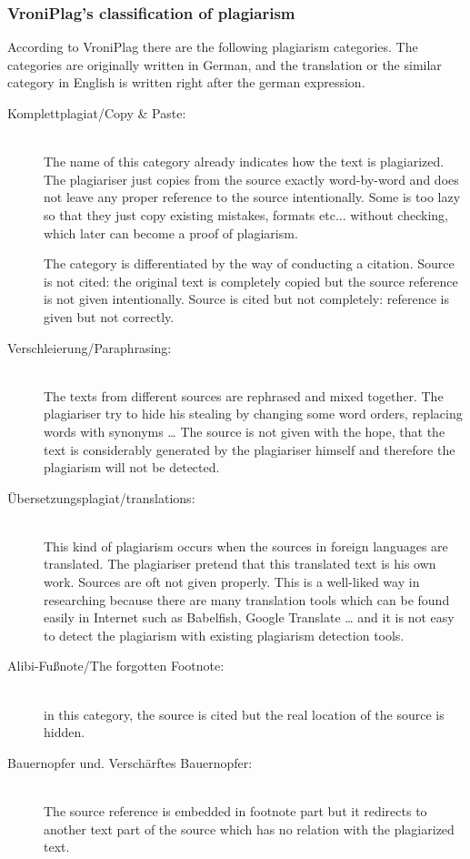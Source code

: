 \subsubsection{VroniPlag’s classification of plagiarism}\label{sec:classification}

According to VroniPlag there are the following plagiarism categories. 
The categories are originally written in German, and the translation or the similar category in English is written 
right after the german expression.

\begin{description}
\item[Komplettplagiat/Copy \& Paste:] \hfill \\
The name of this category already indicates how the text is plagiarized. The 
plagiariser just copies from the source exactly word-by-word and does not leave any proper reference to the source 
intentionally. Some is too lazy so that they just copy existing mistakes, formats etc... without checking, which 
later can become a proof of plagiarism.

The category is differentiated by the way of conducting a citation.
Source is not cited: the original text is completely copied but the source reference is not given intentionally.
Source is cited but not completely: reference is given but not correctly.  

\item[Verschleierung/Paraphrasing:]  \hfill \\
The texts from different sources are rephrased and mixed together. The plagiariser try 
to hide his stealing by changing some word orders, replacing words with synonyms … The source is not given with the hope, 
that the text is considerably generated by the plagiariser himself and therefore the plagiarism will not be detected.

\item[Übersetzungsplagiat/translations:] \hfill \\
This kind of plagiarism occurs when the sources in foreign languages are translated. 
The plagiariser pretend that this translated text is his own work. Sources are oft not given properly. This is a 
well-liked way in researching because there are many translation tools which can be found easily in Internet such as 
Babelfish, Google Translate … and  it is not easy to detect the plagiarism with existing plagiarism detection tools.

\item[Alibi-Fußnote/The forgotten Footnote:] \hfill \\
in this category, the source is cited but the real location of the source is 
hidden.  

\item[Bauernopfer und. Verschärftes Bauernopfer:] \hfill \\
The source reference is embedded in footnote part but it redirects to 
another text part of the source which has no relation with the plagiarized text.
\end{description}

